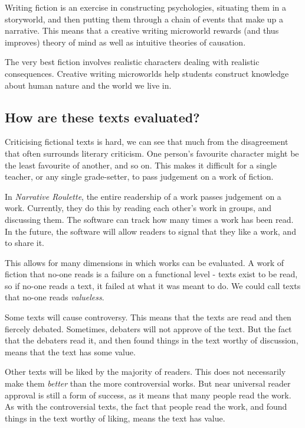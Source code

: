 Writing fiction is an exercise in constructing psychologies, situating
them in a storyworld, and then putting them through a chain of events
that make up a narrative. This means that a creative writing microworld
rewards (and thus improves) theory of mind as well as intuitive theories
of causation.

The very best fiction involves realistic characters dealing with
realistic consequences. Creative writing microworlds help students
construct knowledge about human nature and the world we live in.

\subsection{How are these texts evaluated?}

Criticising fictional texts is hard, we can see that much from the
disagreement that often surrounds literary criticism. One person's
favourite character might be the least favourite of another, and so on.
This makes it difficult for a single teacher, or any single
grade-setter, to pass judgement on a work of fiction.

In \emph{Narrative Roulette}, the entire readership of a work passes
judgement on a work. Currently, they do this by reading each other's
work in groups, and discussing them. The software can track how many
times a work has been read. In the future, the software will allow
readers to signal that they like a work, and to share it.

This allows for many dimensions in which works can be evaluated. A work of
fiction that no-one reads is a failure on a functional level - texts
exist to be read, so if no-one reads a text, it failed at what it was
meant to do. We could call texts that no-one reads \emph{valueless}.

Some texts will cause controversy. This means that the texts are read
and then fiercely debated. Sometimes, debaters will not approve of the
text. But the fact that the debaters read it, and then found things in
the text worthy of discussion, means that the text has some value.

Other texts will be liked by the majority of readers. This does not
necessarily make them \emph{better} than the more controversial works.
But near universal reader approval is still a form of success, as it means
that many people read the work. As with the controversial texts, the fact
that people read the work, and found things in the text worthy of
liking, means the text has value.

